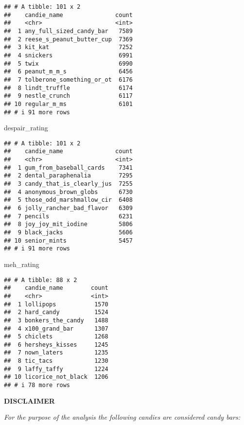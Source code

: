 \documentclass[
]{article}
\newenvironment{Shaded}{\begin{snugshade}}{\end{snugshade}}
\newcommand{\NormalTok}[1]{#1}
\begin{document}
\begin{verbatim}
## # A tibble: 101 x 2
##    candie_name               count
##    <chr>                     <int>
##  1 any_full_sized_candy_bar   7589
##  2 reese_s_peanut_butter_cup  7369
##  3 kit_kat                    7252
##  4 snickers                   6991
##  5 twix                       6990
##  6 peanut_m_m_s               6456
##  7 tolberone_something_or_ot  6176
##  8 lindt_truffle              6174
##  9 nestle_crunch              6117
## 10 regular_m_ms               6101
## # i 91 more rows
\end{verbatim}

\begin{Shaded}
\begin{Highlighting}[]
\NormalTok{despair\_rating}
\end{Highlighting}
\end{Shaded}

\begin{verbatim}
## # A tibble: 101 x 2
##    candie_name               count
##    <chr>                     <int>
##  1 gum_from_baseball_cards    7341
##  2 dental_paraphenalia        7295
##  3 candy_that_is_clearly_jus  7255
##  4 anonymous_brown_globs      6730
##  5 those_odd_marshmallow_cir  6408
##  6 jolly_rancher_bad_flavor   6309
##  7 pencils                    6231
##  8 joy_joy_mit_iodine         5806
##  9 black_jacks                5606
## 10 senior_mints               5457
## # i 91 more rows
\end{verbatim}

\begin{Shaded}
\begin{Highlighting}[]
\NormalTok{meh\_rating }
\end{Highlighting}
\end{Shaded}

\begin{verbatim}
## # A tibble: 88 x 2
##    candie_name        count
##    <chr>              <int>
##  1 lollipops           1570
##  2 hard_candy          1524
##  3 bonkers_the_candy   1488
##  4 x100_grand_bar      1307
##  5 chiclets            1268
##  6 hersheys_kisses     1245
##  7 nown_laters         1235
##  8 tic_tacs            1230
##  9 laffy_taffy         1224
## 10 licorice_not_black  1206
## # i 78 more rows
\end{verbatim}

\textbf{DISCLAIMER}

\emph{For the purpose of the analysis the following candies are
considered candy bars:}
\end{document}
